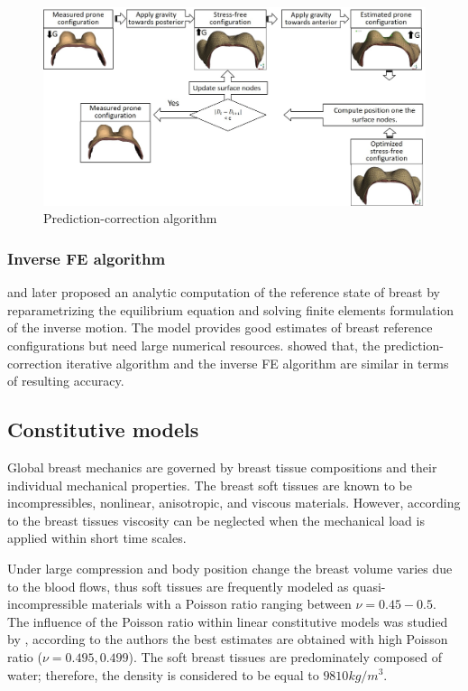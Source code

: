 \begin{figure}[!h]
\centering
\includegraphics[width=1\textwidth,keepaspectratio]{figures/prediction-correction.jpg} 
\caption{Prediction-correction algorithm}\label{predictioncorectionalgo}
\end{figure}


 \subsubsection*{Inverse FE algorithm}
\cite{pathmanathan_predicting_2008} and later \cite{vavourakis_inverse_2016} proposed an analytic computation of the reference state of breast by reparametrizing the equilibrium equation and solving finite elements formulation of the inverse motion. The model provides good estimates of breast reference configurations but need large numerical resources. \cite{eiben_breast_2014} showed that, the prediction-correction iterative algorithm and the inverse FE algorithm are similar in terms of resulting accuracy. 

\subsection{Constitutive models}

Global breast mechanics are governed by breast tissue compositions and their individual mechanical properties. The breast soft tissues are known to be incompressibles, nonlinear, anisotropic, and viscous materials. However, according to \cite{wellman_breast_1999} the breast tissues viscosity can be neglected when the mechanical load is applied within short time scales.  

Under large compression and body position change the breast volume varies due to the blood flows, thus soft tissues are frequently modeled as quasi-incompressible materials with a Poisson ratio ranging between $\nu = {0.45-0.5}$. The influence of the Poisson ratio within linear constitutive models was studied by \cite{tanner_factors_2006}, according to the authors the best estimates are obtained with high Poisson ratio ($\nu = {0.495,0.499}$). The soft breast tissues are predominately composed of water; therefore, the density is considered to be equal to $9810 kg/m^3$.  


